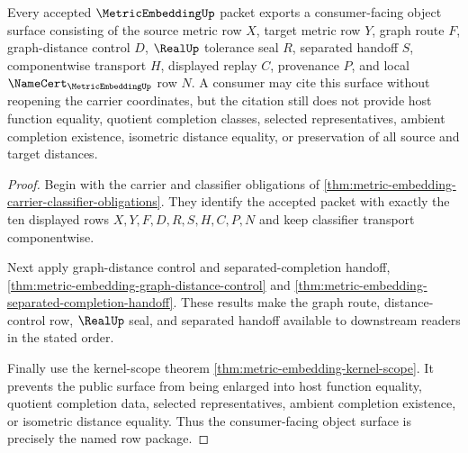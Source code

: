 \begin{theorem}
\label{thm:metric-embedding-public-object-surface}
Every accepted $\MetricEmbeddingUp$ packet exports a consumer-facing object surface consisting of the source metric row $X$, target metric row $Y$, graph route $F$, graph-distance control $D$, $\RealUp$ tolerance seal $R$, separated handoff $S$, componentwise transport $H$, displayed replay $C$, provenance $P$, and local $\NameCert_{\MetricEmbeddingUp}$ row $N$. A consumer may cite this surface without reopening the carrier coordinates, but the citation still does not provide host function equality, quotient completion classes, selected representatives, ambient completion existence, isometric distance equality, or preservation of all source and target distances.
\end{theorem}
\begin{proof}
Begin with the carrier and classifier obligations of \autoref{thm:metric-embedding-carrier-classifier-obligations}. They identify the accepted packet with exactly the ten displayed rows $X,Y,F,D,R,S,H,C,P,N$ and keep classifier transport componentwise.

Next apply graph-distance control and separated-completion handoff, \autoref{thm:metric-embedding-graph-distance-control} and \autoref{thm:metric-embedding-separated-completion-handoff}. These results make the graph route, distance-control row, $\RealUp$ seal, and separated handoff available to downstream readers in the stated order.

Finally use the kernel-scope theorem \autoref{thm:metric-embedding-kernel-scope}. It prevents the public surface from being enlarged into host function equality, quotient completion data, selected representatives, ambient completion existence, or isometric distance equality. Thus the consumer-facing object surface is precisely the named row package.
\end{proof}


\begin{closurestatus}{\MetricEmbeddingUp}
  \theoryclosure{\scopedClosure}
  \formalstatus{\unformalizedV}
\end{closurestatus}
